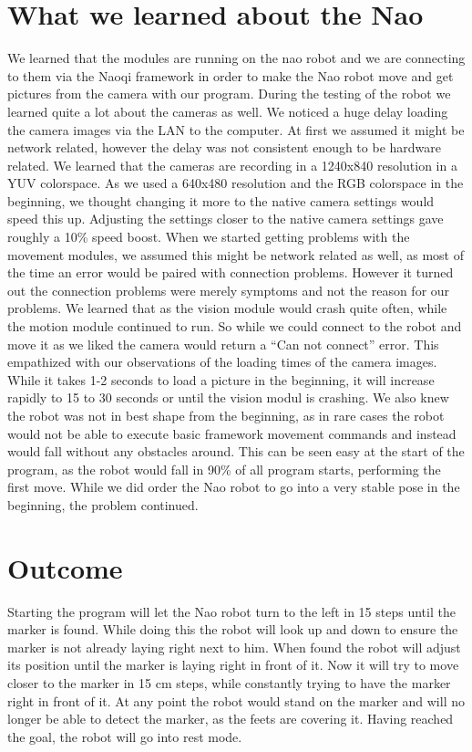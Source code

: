 \documentclass{article}
\begin{document}
\section{What we learned about the Nao}
We learned that the modules are running on the nao robot and we are connecting to them via the Naoqi framework in order to make the Nao robot move and get pictures from the camera with our program. During the testing of the robot we learned quite a lot about the cameras as well. We noticed a huge delay loading the camera images via the LAN to the computer. At first we assumed it might be network related, however the delay was not consistent enough to be hardware related. We learned that the cameras are recording in a 1240x840 resolution in a YUV colorspace. As we used a 640x480 resolution and the RGB colorspace in the beginning, we thought changing it more to the native camera settings would speed this up. Adjusting the settings closer to the native camera settings gave roughly a 10\% speed boost. When we started getting problems with the movement modules, we assumed this might be network related as well, as most of the time an error would be paired with connection problems. However it turned out the connection problems were merely symptoms and not the reason for our problems. We learned that as the vision module would crash quite often, while the motion module continued to run. So while we could connect to the robot and move it as we liked the camera would return a “Can not connect” error. This empathized with our observations of the loading times of the camera images. While it takes 1-2 seconds to load a picture in the beginning, it will increase rapidly to 15 to 30 seconds or until the vision modul is crashing. We also knew the robot was not in best shape from the beginning, as in rare cases the robot would not be able to execute basic framework movement commands and instead would fall without any obstacles around. This can be seen easy at the start of the program, as the robot would fall in 90\% of all program starts, performing the first move. While we did order the Nao robot to go into a very stable pose in the beginning, the problem continued.

\section{Outcome}
Starting the program will let the Nao robot turn to the left in 15\degree{} steps until the marker is found. While doing this the robot will look up and down to ensure the marker is not already laying right next to him. When found the robot will adjust its position until the marker is laying right in front of it. Now it will try to move closer to the marker in 15 cm steps, while constantly trying to have the marker right in front of it. At any point the robot would stand on the marker and will no longer be able to detect the marker, as the feets are covering it. Having reached the goal, the robot will go into rest mode.
\end{document}
